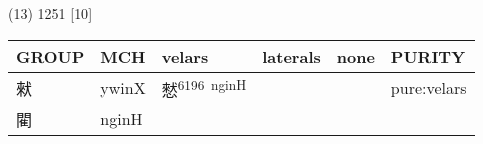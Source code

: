 \documentclass[14pt,a4paper]{scrartcl}
\begin{document}
(13) 1251 {[}10{]}

\begin{longtable}[c]{@{}llllll@{}}
\toprule
\begin{minipage}[b]{0.14\columnwidth}\raggedright\strut
GROUP
\strut\end{minipage} &
\begin{minipage}[b]{0.14\columnwidth}\raggedright\strut
MCH
\strut\end{minipage} &
\begin{minipage}[b]{0.14\columnwidth}\raggedright\strut
velars
\strut\end{minipage} &
\begin{minipage}[b]{0.14\columnwidth}\raggedright\strut
laterals
\strut\end{minipage} &
\begin{minipage}[b]{0.14\columnwidth}\raggedright\strut
none
\strut\end{minipage} &
\begin{minipage}[b]{0.14\columnwidth}\raggedright\strut
PURITY
\strut\end{minipage}\tabularnewline
\midrule
\endhead
\begin{minipage}[t]{0.14\columnwidth}\raggedright\strut
猌
\strut\end{minipage} &
\begin{minipage}[t]{0.14\columnwidth}\raggedright\strut
ywinX
\strut\end{minipage} &
\begin{minipage}[t]{0.14\columnwidth}\raggedright\strut
憖\textsuperscript{6196~nginH}
\strut\end{minipage} &
\begin{minipage}[t]{0.14\columnwidth}\raggedright\strut
\strut\end{minipage} &
\begin{minipage}[t]{0.14\columnwidth}\raggedright\strut
\strut\end{minipage} &
\begin{minipage}[t]{0.14\columnwidth}\raggedright\strut
pure:velars
\strut\end{minipage}\tabularnewline
\begin{minipage}[t]{0.14\columnwidth}\raggedright\strut
閵
\strut\end{minipage} &
\begin{minipage}[t]{0.14\columnwidth}\raggedright\strut
nginH
\strut\end{minipage} &
\begin{minipage}[t]{0.14\columnwidth}\raggedright\strut

\end{minipage}
\end{longtable}
\end{document}
